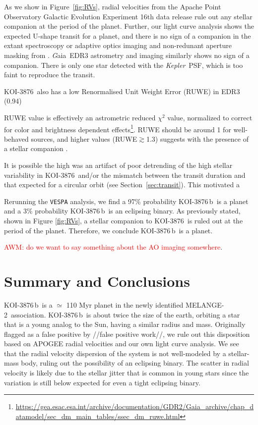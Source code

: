 \documentclass[twocolumn]{aastex631}
\newcommand{\starname}{KOI-3876}
\newcommand{\planetname}{KOI-3876\,b}
\newcommand{\kepler}{{\it Kepler}}
\newcommand{\gaia}{{\textit Gaia}}
\newcommand{\association}{MELANGE-2}
\begin{document}
 As we show in Figure~\ref{fig:RVs}, radial velocities from the Apache Point Observatory Galactic Evolution Experiment 16th data release \citep[APOGEE DR16;][]{2020AJ....160..120J} rule out any stellar companion at the period of the planet. Further, our light curve analysis shows the expected U-shape transit for a planet, and there is no sign of a companion in the extant spectroscopy or adaptive optics imaging and non-redunant aperture masking from \citet{Kraus2016a}. \gaia\ EDR3 astrometry and imaging similarly shows no sign of a companion. There is only one star detected with the \kepler\ PSF, which is too faint to reproduce the transit. 
 
 \starname\ also has a low Renormalised Unit Weight Error (RUWE) in EDR3 (0.94)
 
 RUWE value is effectively an astrometric reduced $\chi^2$ value, normalized to correct for color and brightness dependent effects\footnote{\url{https://gea.esac.esa.int/archive/documentation/GDR2/Gaia_archive/chap_datamodel/sec_dm_main_tables/ssec_dm_ruwe.html}}. RUWE should be around 1 for well-behaved sources, and higher values (RUWE$\gtrsim$1.3) suggests with the presence of a stellar companion \citep{Ziegler2020, 2021arXiv210609040W}. 
 
 It is possible the high \citet{2016ApJ...822...86M} was an artifact of poor detrending of the high stellar variability in \starname\ and/or the mismatch between the transit duration and that expected for a circular orbit (see Section~\ref{sec:transit}). This motivated a 

Rerunning the \texttt{VESPA} analysis, we find a 97\% probability \planetname\ is a planet and a 3\% probability \planetname\ is an eclipsing binary. As previously stated, shown in Figure \ref{fig:RVs}, a stellar companion to \starname\ is ruled out at the period of the planet. Therefore, we conclude \planetname\ is a planet.

\textcolor{red}{AWM: do we want to say something about the AO imaging somewhere}. 


\section{Summary and Conclusions}\label{sec:summary}
\planetname\ is a $\simeq$ 110 Myr planet in the newly identified \association\ association. \planetname\ is about twice the size of the earth, orbiting a star that is a young analog to the Sun, having a similar radius and mass. Originally flagged as a false positive by //false positive work//, we rule out this disposition based on APOGEE radial velocities and our own light curve analysis. We see that the radial velocity dispersion of the system is not well-modeled by a stellar-mass body, ruling out the possibility of an eclipsing binary. The scatter in radial velocity is likely due to the stellar jitter that is common in young stars since the variation is still below expected for even a tight eclipsing binary.
\end{document}
